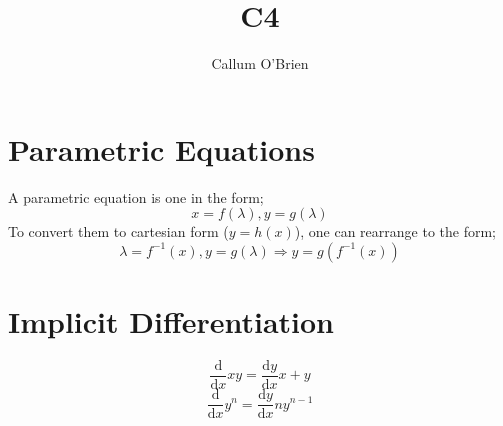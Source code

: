 \documentclass{article}
\title{C4}
\author{Callum O'Brien}
\begin{document}
\maketitle
\tableofcontents
\newpage

\section{Parametric Equations}

A parametric equation is one in the form;
\[x=f(\lambda),y=g(\lambda)\]
\noindent To convert them to cartesian form ($y=h(x)$), one can rearrange to the form;
\[\lambda=f^{-1}(x),y=g(\lambda)\Rightarrow y=g(f^{-1}(x))\]

\section{Implicit Differentiation}

\[\frac{\textrm{d}}{\textrm{d}x}xy=\frac{\textrm{d}y}{\textrm{d}x}x+y\]
\[\frac{\textrm{d}}{\textrm{d}x}y^n=\frac{\textrm{d}y}{\textrm{d}x}ny^{n-1}\]
\end{document}

